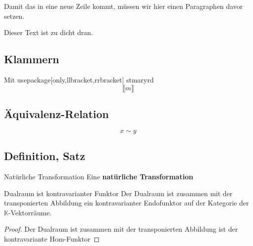\documentclass[a4paper]{amsart}
\theoremstyle{definition}
\newcommand{\K}{\ensuremath{\mathbb{ K }}}
\begin{document}
Damit das in eine neue Zeile kommt, müssen wir hier einen Paragraphen davor setzen.

\noindent{}
Dieser Text ist zu dicht dran.

\subsection{Klammern}
Mit usepackage[only,llbracket,rrbracket] stmaryrd
\begin{equation}
   \llbracket m \rrbracket
\end{equation}

\subsection{Äquivalenz-Relation}
\begin{equation}
   x \sim y
\end{equation}




\subsection{Definition, Satz}
\begin{Definition}{Natürliche Transformation}
   Eine \textbf{natürliche Transformation} 
\end{Definition}

\begin{Theorem}{Dualraum ist kontravarianter Funktor}
   Der Dualraum ist zusammen mit der transponierten Abbildung ein kontravarianter Endofunktor auf der Kategorie der $\K$-Vektorräume.   
\end{Theorem}
\begin{proof}
   Der Dualraum ist zusammen mit der transponierten Abbildung ist der kontravariante Hom-Funktor 
\end{proof}
\end{document}
